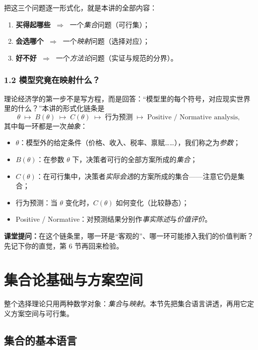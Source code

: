 把这三个问题逐一形式化，就是本讲的全部内容：
\begin{enumerate}
  \item \textbf{买得起哪些} $\;\Longrightarrow\;$ 一个\emph{集合}问题（可行集）；
  \item \textbf{会选哪个} $\;\Longrightarrow\;$ 一个\emph{映射}问题（选择对应）；
  \item \textbf{好不好} $\;\Longrightarrow\;$ 一个\emph{方法论}问题（实证与规范的分界）。
\end{enumerate}



\subsubsection*{1.2 模型究竟在映射什么？}



理论经济学的第一步不是写方程，而是回答：“模型里的每个符号，对应现实世界里的什么？”本讲的形式化链条是
\[
\theta \;\longmapsto\; B(\theta) \;\longmapsto\; C(\theta)
\;\longmapsto\; \text{行为预测} \;\longmapsto\; \text{Positive / Normative analysis},
\]
其中每一环都是一次\emph{抽象}：
\begin{itemize}
  \item $\theta$：模型外的给定条件（价格、收入、税率、禀赋……），我们称之为\emph{参数}；
  \item $B(\theta)$：在参数 $\theta$ 下，决策者可行的全部方案所成的\emph{集合}；
  \item $C(\theta)$：在可行集中，决策者\emph{实际会选}的方案所成的集合——注意它仍是集合；
  \item 行为预测：当 $\theta$ 变化时，$C(\theta)$ 如何变化（比较静态）；
  \item Positive / Normative：对预测结果分别作\emph{事实陈述}与\emph{价值评价}。
\end{itemize}

\medskip
\noindent\textbf{课堂提问：}在这个链条里，哪一环是“客观的”、哪一环可能掺入我们的价值判断？先记下你的直觉，第 6 节再回来检验。

\section{集合论基础与方案空间}

整个选择理论只用两种数学对象：\emph{集合}与\emph{映射}。本节先把集合语言讲透，再用它定义方案空间与可行集。

\subsection{集合的基本语言}



